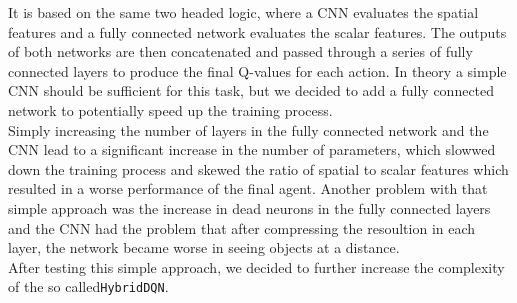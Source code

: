 \documentclass[11pt,a4paper]{article}
\begin{document}
It is based on the same two headed logic, where a CNN evaluates the spatial features and a fully connected network evaluates the scalar features. The outputs of both networks are then concatenated and passed through a series of fully connected layers to produce the final Q-values for each action. In theory a simple CNN should be sufficient for this task, but we decided to add a fully connected network to potentially speed up the training process.\\
Simply increasing the number of layers in the fully connected network and the CNN lead to a significant increase in the number of parameters, which slowwed down the training process and skewed the ratio of spatial to scalar features which resulted in a worse performance of the final agent. Another problem with that simple approach was the increase in dead neurons in the fully connected layers and the CNN had the problem that after compressing the resoultion in each layer, the network became worse in seeing objects at a distance.\\
After testing this simple approach, we decided to further increase the complexity of the so called\texttt{HybridDQN}.
\end{document}
